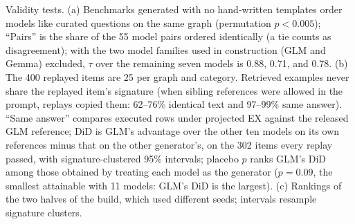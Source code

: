 \begin{table}[H]
\caption{Validity tests. (a) Benchmarks generated with no hand-written templates order models like curated questions on the same graph (permutation $p<0.005$); ``Pairs'' is the share of the 55 model pairs ordered identically (a tie counts as disagreement); with the two model families used in construction (GLM and Gemma) excluded, $\tau$ over the remaining seven models is 0.88, 0.71, and 0.78. (b) The 400 replayed items are 25 per graph and category. Retrieved examples never share the replayed item's signature (when sibling references were allowed in the prompt, replays copied them: 62--76\% identical text and 97--99\% same answer). ``Same answer'' compares executed rows under projected EX against the released GLM reference; DiD is GLM's advantage over the other ten models on its own references minus that on the other generator's, on the 302 items every replay passed, with signature-clustered 95\% intervals; placebo $p$ ranks GLM's DiD among those obtained by treating each model as the generator ($p=0.09$, the smallest attainable with 11 models: GLM's DiD is the largest). (c) Rankings of the two halves of the build, which used different seeds; intervals resample signature clusters.}
\label{tab:validity}
\end{table}
